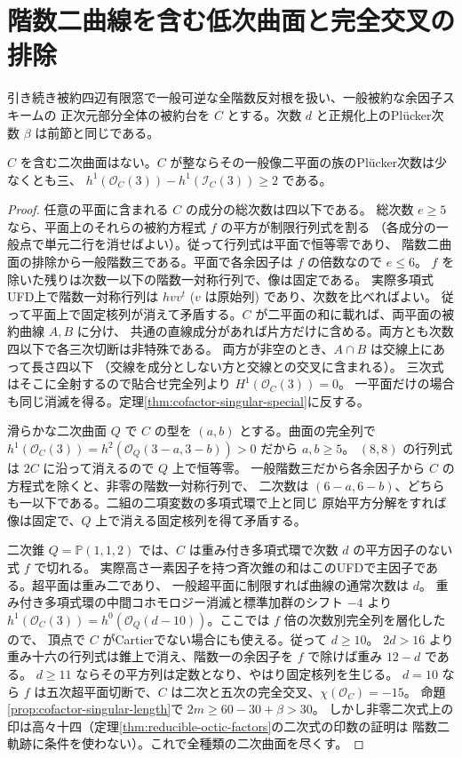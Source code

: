 \section{階数二曲線を含む低次曲面と完全交叉の排除}
\label{sec:cofactor-low-surfaces}
引き続き被約四辺有限窓で一般可逆な全階数反対根を扱い、一般被約な余因子スキームの
正次元部分全体の被約台を $C$ とする。次数 $d$ と正規化上のPlücker次数 $\beta$ は前節と同じである。
\begin{theorem}\label{thm:cofactor-no-quadrics}
$C$ を含む二次曲面はない。$C$ が整ならその一般像二平面の族のPlücker次数は少なくとも三、
$h^1(\mathcal O_C(3))-h^1(\mathcal I_C(3))\ge2$ である。
\end{theorem}
\begin{proof}
任意の平面に含まれる $C$ の成分の総次数は四以下である。
総次数 $e\ge5$ なら、平面上のそれらの被約方程式 $f$ の平方が制限行列式を割る
（各成分の一般点で単元二行を消せばよい）。従って行列式は平面で恒等零であり、
階数二曲面の排除から一般階数三である。平面で各余因子は $f$ の倍数なので $e\le6$。
$f$ を除いた残りは次数一以下の階数一対称行列で、像は固定である。
実際多項式UFD上で階数一対称行列は $hvv^t$ ($v$ は原始列) であり、次数を比べればよい。
従って平面上で固定核列が消えて矛盾する。$C$ が二平面の和に載れば、両平面の被約曲線 $A,B$ に分け、
共通の直線成分があれば片方だけに含める。両方とも次数四以下で各三次切断は非特殊である。
両方が非空のとき、$A\cap B$ は交線上にあって長さ四以下
（交線を成分としない方と交線との交叉に含まれる）。
三次式はそこに全射するので貼合せ完全列より $H^1(\mathcal O_C(3))=0$。
一平面だけの場合も同じ消滅を得る。定理\ref{thm:cofactor-singular-special}に反する。

滑らかな二次曲面 $Q$ で $C$ の型を $(a,b)$ とする。曲面の完全列で
$h^1(\mathcal O_C(3))=h^2(\mathcal O_Q(3-a,3-b))>0$ だから $a,b\ge5$。
$(8,8)$ の行列式は $2C$ に沿って消えるので $Q$ 上で恒等零。
一般階数三だから各余因子から $C$ の方程式を除くと、非零の階数一対称行列で、
二次数は $(6-a,6-b)$、どちらも一以下である。二組の二項変数の多項式環で上と同じ
原始平方分解をすれば像は固定で、$Q$ 上で消える固定核列を得て矛盾する。

二次錐 $Q=\mathbb P(1,1,2)$ では、$C$ は重み付き多項式環で次数 $d$ の平方因子のない式 $f$ で切れる。
実際高さ一素因子を持つ斉次錐の和はこのUFDで主因子である。超平面は重み二であり、
一般超平面に制限すれば曲線の通常次数は $d$。
重み付き多項式環の中間コホモロジー消滅と標準加群のシフト $-4$ より
$h^1(\mathcal O_C(3))=h^0(\mathcal O_Q(d-10))$。ここでは $f$ 倍の次数別完全列を層化したので、
頂点で $C$ がCartierでない場合にも使える。従って $d\ge10$。
$2d>16$ より重み十六の行列式は錐上で消え、階数一の余因子を $f$ で除けば重み $12-d$ である。
$d\ge11$ ならその平方列は定数となり、やはり固定核列を生じる。
$d=10$ なら $f$ は五次超平面切断で、$C$ は二次と五次の完全交叉、$\chi(\mathcal O_C)=-15$。
命題\ref{prop:cofactor-singular-length}で $2m\ge60-30+\beta>30$。
しかし非零二次式上の印は高々十四（定理\ref{thm:reducible-octic-factors}の二次式の印数の証明は
階数二軌跡に条件を使わない）。これで全種類の二次曲面を尽くす。


\end{proof}
